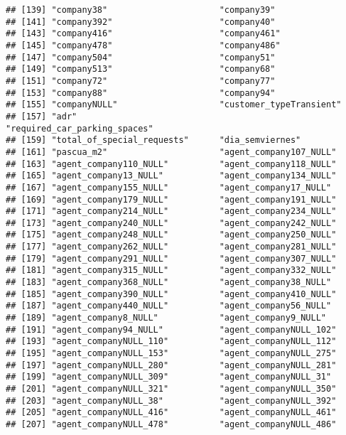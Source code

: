 \documentclass[
]{book}
\begin{document}
\begin{verbatim}
## [139] "company38"                      "company39"                     
## [141] "company392"                     "company40"                     
## [143] "company416"                     "company461"                    
## [145] "company478"                     "company486"                    
## [147] "company504"                     "company51"                     
## [149] "company513"                     "company68"                     
## [151] "company72"                      "company77"                     
## [153] "company88"                      "company94"                     
## [155] "companyNULL"                    "customer_typeTransient"        
## [157] "adr"                            "required_car_parking_spaces"   
## [159] "total_of_special_requests"      "dia_semviernes"                
## [161] "pascua_m2"                      "agent_company107_NULL"         
## [163] "agent_company110_NULL"          "agent_company118_NULL"         
## [165] "agent_company13_NULL"           "agent_company134_NULL"         
## [167] "agent_company155_NULL"          "agent_company17_NULL"          
## [169] "agent_company179_NULL"          "agent_company191_NULL"         
## [171] "agent_company214_NULL"          "agent_company234_NULL"         
## [173] "agent_company240_NULL"          "agent_company242_NULL"         
## [175] "agent_company248_NULL"          "agent_company250_NULL"         
## [177] "agent_company262_NULL"          "agent_company281_NULL"         
## [179] "agent_company291_NULL"          "agent_company307_NULL"         
## [181] "agent_company315_NULL"          "agent_company332_NULL"         
## [183] "agent_company368_NULL"          "agent_company38_NULL"          
## [185] "agent_company390_NULL"          "agent_company410_NULL"         
## [187] "agent_company440_NULL"          "agent_company56_NULL"          
## [189] "agent_company8_NULL"            "agent_company9_NULL"           
## [191] "agent_company94_NULL"           "agent_companyNULL_102"         
## [193] "agent_companyNULL_110"          "agent_companyNULL_112"         
## [195] "agent_companyNULL_153"          "agent_companyNULL_275"         
## [197] "agent_companyNULL_280"          "agent_companyNULL_281"         
## [199] "agent_companyNULL_309"          "agent_companyNULL_31"          
## [201] "agent_companyNULL_321"          "agent_companyNULL_350"         
## [203] "agent_companyNULL_38"           "agent_companyNULL_392"         
## [205] "agent_companyNULL_416"          "agent_companyNULL_461"         
## [207] "agent_companyNULL_478"          "agent_companyNULL_486"         

\end{verbatim}
\end{document}
